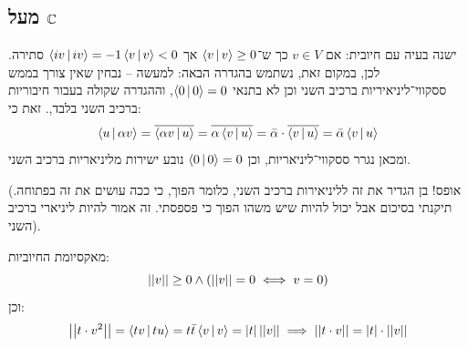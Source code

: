 \documentclass[]{../../../../tex/classes/styledArticle}
\begin{document}
    \subsection{מעל $\C$}
    ישנה בעיה עם חיובית: אם $v \in V$ כך ש־$\mut{v}{v} \ge 0$ אך $\mut{iv}{iv} = -1\mut{v}{v} < 0$ סתירה. לכן, במקום זאת, נשתמש בהגדרה הבאה: 
    למעשה – נבחין שאין צורך בממש ססקווי־ליניאיריות ברכיב השני וכן לא בתנאי $\mut{0}{0} = 0$, וההגדרה שקולה בעבור חיבוריות ברכיב השני בלבד,. זאת כי: 
    \[ \mut{u}{\ag v} = \ol{\mut{\ag v}{u}} = \ol{\ag \mut{v}{u}} = \bar \ag \cdot \ol{\mut{v}{u}} = \bar \ag \mut{v}{u} \]
    ומכאן נגרר ססקווי־ליניאריות, וכן $\mut{0}{0} = 0$ נובע ישירות מליניאריות ברכיב השני. 
    
    (אופס! בן הגדיר את זה לליניאירות ברכיב השני, כלומר הפוך, כי ככה עושים את זה בפתוחה. תיקנתי בסיכום אבל יכול להיות שיש משהו הפוך כי פספסתי. זה אמור להיות ליניארי ברכיב השני).
    
    
    
    מאקסיומת החיוביות: 
    \[ \norm{v} \ge 0 \land (\norm{v} = 0 \iff v = 0) \]
    וכן: 
    \[ \norm{t \cdot v^2} = \mut{tv}{tu} = t \bar t\mut{v}{v} = \sof{t}\norm{v} \implies \norm{t \cdot v} = \sof{t} \cdot \norm{v} \]
    
    
    
    
    
    
    
    \ndoc
\end{document}
